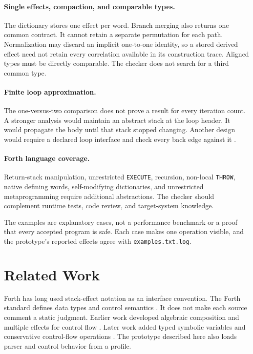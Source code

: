 \documentclass[11pt,a4paper]{article}
\begin{document}
\paragraph{Single effects, compaction, and comparable types.}
The dictionary stores one effect per word.  Branch merging also returns one
common contract.  It cannot retain a separate permutation for each path.
Normalization may discard an implicit one-to-one identity, so a stored derived
effect need not retain every correlation available in its construction trace.
Aligned types must be directly comparable.  The checker does not search for a
third common type.

\paragraph{Finite loop approximation.}
The one-versus-two comparison does not prove a result for every iteration
count.  A stronger analysis would maintain an abstract stack at the loop
header.  It would propagate the body until that stack stopped changing.
Another design would require a declared loop interface and check every back
edge against it \cite{cousot1977}.

\paragraph{Forth language coverage.}
Return-stack manipulation, unrestricted \texttt{EXECUTE}, recursion,
non-local \texttt{THROW}, native defining words, self-modifying dictionaries,
and unrestricted metaprogramming require additional abstractions.  The checker
should complement runtime tests, code review, and target-system knowledge.

The examples are explanatory cases, not a performance benchmark or a proof
that every accepted program is safe.  Each case makes one operation visible,
and the prototype's reported effects agree with \texttt{examples.txt.log}.

\section{Related Work}

Forth has long used stack-effect notation as an interface convention.  The
Forth standard defines data types and control semantics \cite{forth2012}.  It
does not make each source comment a static judgment.  Earlier work developed
algebraic composition and multiple effects for control flow
\cite{poial1994,poial1992}.  Later work added typed symbolic variables and
conservative control-flow operations \cite{poial2002,poial2006}.  The
prototype described here also loads parser and control behavior from a
profile.
\end{document}
